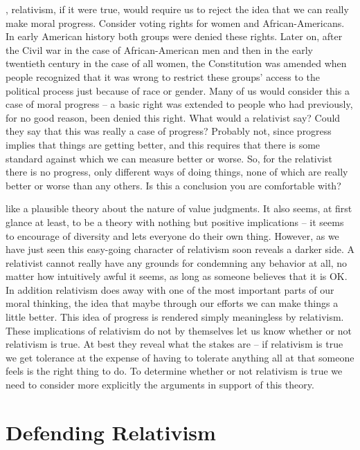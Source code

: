 \documentclass[justified]{tufte-book}
\begin{document}
, relativism, if it were true, would require us to reject the idea that we can really make moral progress. Consider voting rights for women and African-Americans. In early American history both groups were denied these rights. Later on, after the Civil war in the case of African-American men and then in the early twentieth century in the case of all women, the Constitution was amended when people recognized that it was wrong to restrict these groups' access to the political process just because of race or gender. Many of us would consider this a case of moral progress -- a basic right was extended to people who had previously, for no good reason, been denied this right. What would a relativist say? Could they say that this was really a case of progress? Probably not, since progress implies that things are getting better, and this requires that there is some standard against which we can measure better or worse. So, for the relativist there is no progress, only different ways of doing things, none of which are really better or worse than any others. Is this a conclusion you are comfortable with?

 like a plausible theory about the nature of value judgments. It also seems, at first glance at least, to be a theory with nothing but positive implications -- it seems to encourage of diversity and lets everyone do their own thing. However, as we have just seen this easy-going character of relativism soon reveals a darker side. A relativist cannot really have any grounds for condemning any behavior at all, no matter how intuitively awful it seems, as long as someone believes that it is OK. In addition relativism does away with one of the most important parts of our moral thinking, the idea that maybe through our efforts we can make things a little better. This idea of progress is rendered simply meaningless by relativism. These implications of relativism do not by themselves let us know whether or not relativism is true. At best they reveal what the stakes are -- if relativism is true we get tolerance at the expense of having to tolerate anything all at that someone feels is the right thing to do. To determine whether or not relativism is true we need to consider more explicitly the arguments in support of this theory.

\hypertarget{defending-relativism}{%
\section{Defending Relativism}\label{defending-relativism}}
\end{document}
